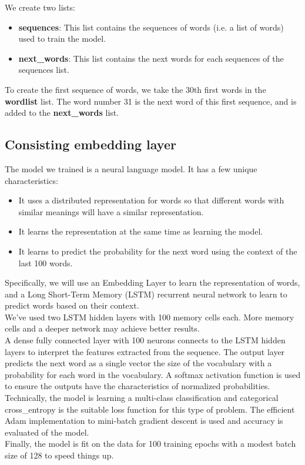\documentclass[conference]{IEEEtran}
\begin{document}
We create two lists:

\begin{itemize}
\item \textbf{sequences}: This list contains the sequences of words (i.e. a list of words) used to train the model.
\item \textbf{next\_words}: This list contains the next words for each sequences of the sequences list.
\end{itemize}

To create the first sequence of words, we take the 30th first words in the \textbf{wordlist} list. The word number 31 is the next word of this first sequence, and is added to the \textbf{next\_words} list.

\subsection{Consisting embedding layer}\label{subsec_embedding_layer}

The model we trained is a neural language model. It has a few unique characteristics:

\begin{itemize}
\item It uses a distributed representation for words so that different words with similar meanings will have a similar representation.
\item It learns the representation at the same time as learning the model.
\item It learns to predict the probability for the next word using the context of the last 100 words.
\end{itemize}

Specifically, we will use an Embedding Layer to learn the representation of words, and a Long Short-Term Memory (LSTM) recurrent neural network to learn to predict words based on their context.\\
We’ve used two LSTM hidden layers with 100 memory cells each. More memory cells and a deeper network may achieve better results.\\
A dense fully connected layer with 100 neurons connects to the LSTM hidden layers to interpret the features extracted from the sequence. The output layer predicts the next word as a single vector the size of the vocabulary with a probability for each word in the vocabulary. A softmax activation function is used to ensure the outputs have the characteristics of normalized probabilities.\\
Technically, the model is learning a multi-class classification and categorical cross\_entropy is the suitable loss function for this type of problem. The efficient Adam implementation to mini-batch gradient descent is used and accuracy is evaluated of the model.\\
Finally, the model is fit on the data for 100 training epochs with a modest batch size of 128 to speed things up.\\
\end{document}
